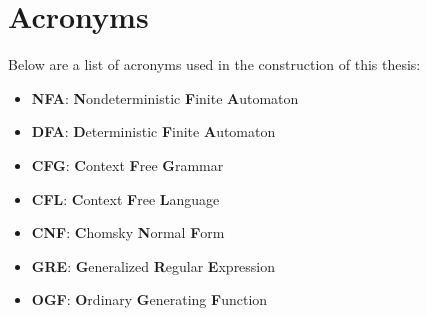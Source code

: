 \chapter*{\rm\bfseries Acronyms}
\label{ch:acronyms}

Below are a list of acronyms used in the construction of this thesis:

\begin{itemize}
    \item{\textbf{NFA}: \textbf{N}ondeterministic \textbf{F}inite \textbf{A}utomaton}
    \item{\textbf{DFA}: \textbf{D}eterministic \textbf{F}inite \textbf{A}utomaton}
    \item{\textbf{CFG}: \textbf{C}ontext \textbf{F}ree \textbf{G}rammar}
    \item{\textbf{CFL}: \textbf{C}ontext \textbf{F}ree \textbf{L}anguage}
    \item{\textbf{CNF}: \textbf{C}homsky \textbf{N}ormal \textbf{F}orm}
    \item {\textbf{GRE}: \textbf{G}eneralized \textbf{R}egular \textbf{E}xpression}
    \item {\textbf{OGF}: \textbf{O}rdinary \textbf{G}enerating \textbf{F}unction}
\end{itemize}
